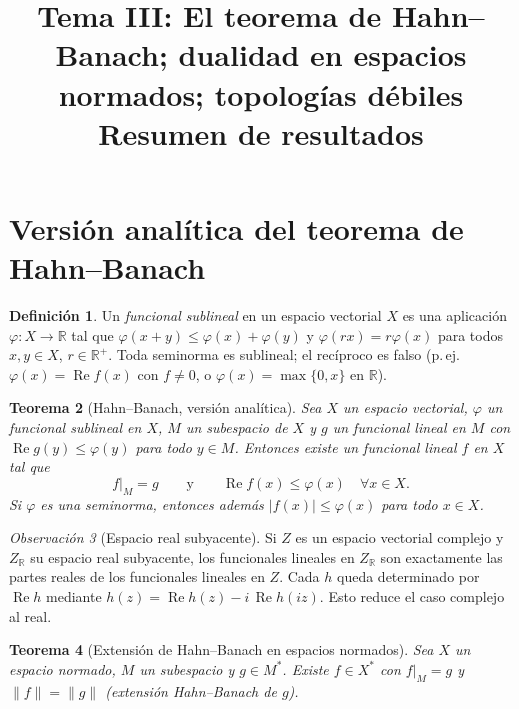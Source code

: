\documentclass[11pt,a4paper]{article}
\title{Tema III: El teorema de Hahn--Banach; dualidad en espacios normados; topologías débiles\\[2mm]\large Resumen de resultados}
\author{}
\date{}
\newcommand{\R}{\mathbb{R}}
\newcommand{\norm}[1]{\lVert #1\rVert}
\newcommand{\abs}[1]{\lvert #1\rvert}
\renewcommand{\Re}{\operatorname{Re}}
\theoremstyle{plain}
\newtheorem{teorema}{Teorema}[section]
\theoremstyle{definition}
\newtheorem{definicion}[teorema]{Definición}
\theoremstyle{remark}
\newtheorem{observacion}[teorema]{Observación}
\begin{document}
\maketitle
\tableofcontents

\section{Versión analítica del teorema de Hahn--Banach}

\begin{definicion}
Un \emph{funcional sublineal} en un espacio vectorial $X$ es una aplicación $\varphi:X\to\R$ tal que
$\varphi(x+y)\le\varphi(x)+\varphi(y)$ y $\varphi(rx)=r\varphi(x)$ para todos $x,y\in X$, $r\in\R^+$.
Toda seminorma es sublineal; el recíproco es falso (p.\,ej. $\varphi(x)=\Re f(x)$ con $f\neq0$, o $\varphi(x)=\max\{0,x\}$ en $\R$).
\end{definicion}

\begin{teorema}[Hahn--Banach, versión analítica]
Sea $X$ un espacio vectorial, $\varphi$ un funcional sublineal en $X$, $M$ un subespacio de $X$ y $g$ un funcional lineal en $M$ con $\Re g(y)\le\varphi(y)$ para todo $y\in M$. Entonces existe un funcional lineal $f$ en $X$ tal que
\[
f|_M=g \qquad\text{y}\qquad \Re f(x)\le\varphi(x)\quad\forall x\in X.
\]
Si $\varphi$ es una seminorma, entonces además $\abs{f(x)}\le\varphi(x)$ para todo $x\in X$.
\end{teorema}

\begin{observacion}[Espacio real subyacente]
Si $Z$ es un espacio vectorial complejo y $Z_\R$ su espacio real subyacente, los funcionales lineales en $Z_\R$ son exactamente las partes reales de los funcionales lineales en $Z$. Cada $h$ queda determinado por $\Re h$ mediante $h(z)=\Re h(z)-i\,\Re h(iz)$. Esto reduce el caso complejo al real.
\end{observacion}

\begin{teorema}[Extensión de Hahn--Banach en espacios normados]
Sea $X$ un espacio normado, $M$ un subespacio y $g\in M^*$. Existe $f\in X^*$ con $f|_M=g$ y $\norm f=\norm g$ (\emph{extensión Hahn--Banach} de $g$).
\end{teorema}
\end{document}
